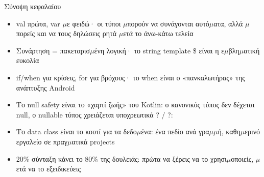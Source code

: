 \begin{tcbsummary}{Σύνοψη κεφαλαίου}
\begin{itemize}
  \item val πρώτα, var $\mu$ε φειδώ· οι τύποι $\mu$πορούν να συνάγονται αυτό$\mu$ατα, αλλά $\mu$πορείς και να τους δηλώσεις ρητά $\mu$ετά το άνω-κάτω τελεία
  \item Συνάρτηση = πακεταρισ$\mu$ένη λογική· το string template \$ είναι η ε$\mu$βλη$\mu$ατική ευκολία
  \item if/when για κρίσεις, for για βρόχους· το when είναι ο «πανκαλωτήρας» της ανάπτυξης Android
  \item Το null safety είναι το «χαρτί ζωής» του Kotlin: ο κανονικός τύπος δεν δέχεται null, ο nullable τύπος χρειάζεται υποχρεωτικά ? / ?:
  \item Το data class είναι το κουτί για τα δεδο$\mu$ένα: ένα πεδίο ανά γρα$\mu$$\mu$ή, καθη$\mu$ερινό εργαλείο σε πραγ$\mu$ατικά projects
  \item 20\% σύνταξη κάνει το 80\% της δουλειάς: πρώτα να ξέρεις να το χρησι$\mu$οποιείς, $\mu$ετά να το εξειδικεύεις
\end{itemize}

\end{tcbsummary}
